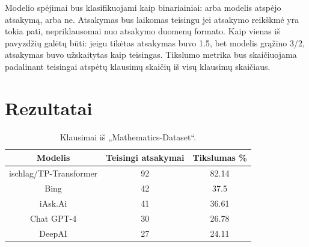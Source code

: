 \documentclass[conference]{IEEEtran}
\begin{document}
Modelio spėjimai bus klasifikuojami kaip binariainiai: arba modelis atspėjo atsakymą, arba ne.
Atsakymas bus laikomas teisingu jei atsakymo reikškmė yra tokia pati, nepriklausomai nuo atsakymo duomenų formato.
Kaip vienas iš pavyzdžių galėtų būti: jeigu tikėtas atsakymas buvo 1.5, bet modelis grąžino
3/2, atsakymas buvo užskaitytas kaip teisingas.
Tikslumo metrika bus skaičiuojama padalinant teisingai atspėtų klausimų skaičių iš visų klausimų skaičiaus.

\section{Rezultatai}
\begin{table}[h!]
    \centering
    \caption{Klausimai iš „Mathematics-Dataset“.}
    \label{lentele:1}
    \begin{tabular}{|c c c|} 
     \hline
     Modelis & Teisingi atsakymai & Tikslumas \% \\ [0.5ex] 
     \hline\hline
     ischlag/TP-Transformer & 92 & 82.14 \\ 
     \hline
     Bing & 42 & 37.5 \\
     \hline
     iAsk.Ai & 41 & 36.61 \\
     \hline
     Chat GPT-4 & 30 & 26.78 \\
     \hline
     DeepAI & 27 & 24.11 \\
     \hline
    \end{tabular}
    \end{table}
\end{document}
